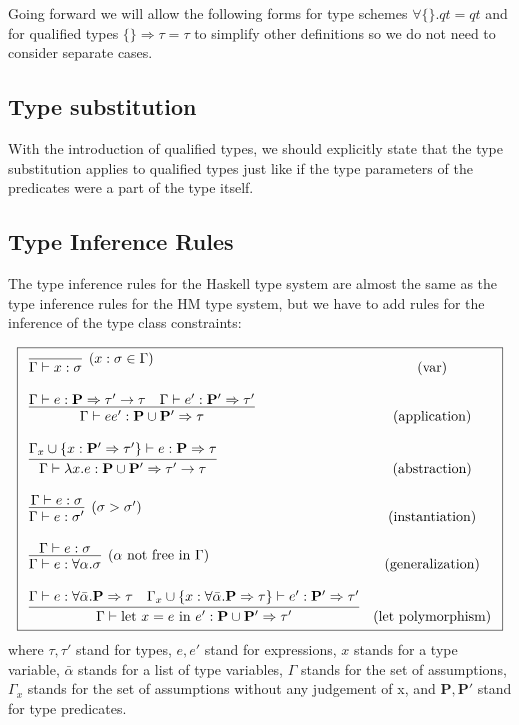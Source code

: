 Going forward we will allow the following forms for type schemes $\forall \{\}. qt = qt$ and for qualified types $\{\} \Rightarrow \tau = \tau$ to simplify other definitions so we do not need to consider separate cases.

\subsection{Type substitution}

With the introduction of qualified types, we should explicitly state that the type substitution applies to qualified types just like if the type parameters of the predicates were a part of the type itself.

\subsection{Type Inference Rules}

The type inference rules for the Haskell type system are almost the same as the type inference rules for the HM type system, but we have to add rules for the inference of the type class constraints:

\begin{defn}
    $$\boxed{\begin{array}{l c}
        \infer[(x : \sigma \in \Gamma)]{\Gamma \vdash x : \sigma}{} & (\text{var}) \\\\
        \infer{\Gamma \vdash e e' : \mathbf{P} \cup \mathbf{P'}  \Rightarrow \tau}{\Gamma \vdash e : \mathbf{P} \Rightarrow \tau' \rightarrow \tau & \Gamma \vdash e' : \mathbf{P'} \Rightarrow \tau'} & (\text{application}) \\\\
        \infer{\Gamma \vdash \lambda x . e : \mathbf{P} \cup \mathbf{P'} \Rightarrow \tau' \rightarrow \tau}{\Gamma_x \cup \{x : \mathbf{P'} \Rightarrow \tau'\} \vdash e : \mathbf{P} \Rightarrow \tau} & (\text{abstraction}) \\\\
        \infer[(\sigma > \sigma')]{\Gamma \vdash e : \sigma'}{\Gamma \vdash e : \sigma} & (\text{instantiation}) \\\\
        \infer[(\alpha \text{ not free in }\Gamma)]{\Gamma \vdash e : \forall \alpha . \sigma}{\Gamma \vdash e : \sigma} & (\text{generalization}) \\\\
        \infer{\Gamma \vdash \text{let } x = e \text{ in } e' : \mathbf{P} \cup \mathbf{P'} \Rightarrow \tau'}{\Gamma \vdash e : \forall \bar{\alpha} .  \mathbf{P} \Rightarrow \tau & \Gamma_x \cup \{x :\forall \bar{\alpha} .  \mathbf{P} \Rightarrow \tau \} \vdash e' : \mathbf{P'} \Rightarrow \tau'} & (\text{let polymorphism})
    \end{array}}$$
    where $\tau, \tau'$ stand for types, $e, e'$ stand for expressions, $x$ stands for a type variable, $\bar{\alpha}$ stands for a list of type variables, $\Gamma$ stands for the set of assumptions, $\Gamma_x$ stands for the set of assumptions without any judgement of x, and $\mathbf{P}, \mathbf{P'}$ stand for type predicates.
\end{defn}

